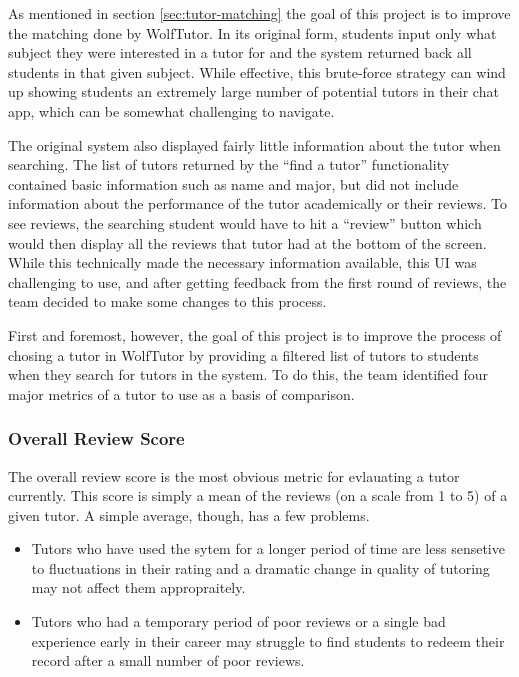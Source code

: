 As mentioned in section \ref{sec:tutor-matching} the goal of this project is to
improve the matching done by WolfTutor.  In its original form, students input
only what subject they were interested in a tutor for and the system returned
back all students in that given subject.  While effective, this brute-force
strategy can wind up showing students an extremely large number of potential
tutors in their chat app, which can be somewhat challenging to navigate.

The original system also displayed fairly little information about the tutor
when searching.  The list of tutors returned by the ``find a tutor''
functionality contained basic information such as name and major, but did not
include information about the performance of the tutor academically or their
reviews.  To see reviews, the searching student would have to hit a ``review''
button which would then display all the reviews that tutor had at the bottom of
the screen. While this technically made the necessary information available,
this UI was challenging to use, and after getting feedback from the first round
of reviews, the team decided to make some changes to this process.  

First and foremost, however, the goal of this project is to improve the process
of chosing a tutor in WolfTutor by providing a filtered list of tutors to
students when they search for tutors in the system.  To do this, the team
identified four major metrics of a tutor to use as a basis of comparison.

\subsubsection{Overall Review Score}
  The overall review score is the most obvious metric for evlauating a tutor
  currently.  This score is simply a mean of the reviews (on a scale from 1 to
  5) of a given tutor.  A simple average, though, has a few problems.
  \begin{itemize}
    \item Tutors who have used the sytem for a longer period of time are less
      sensetive to fluctuations in their rating and a dramatic change in quality
      of tutoring may not affect them appropraitely.
    \item Tutors who had a temporary period of poor reviews or a single bad
      experience early in their career may struggle to find students to redeem
      their record after a small number of poor reviews.  
  \end{itemize}

